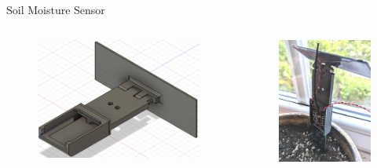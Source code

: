 \documentclass[hyphens]{beamer}
\begin{document}
\begin{frame}{Soil Moisture Sensor}
\begin{columns}[T]
\begin{column}{.5\textwidth}
    \begin{figure}
        \centering
        \includegraphics[width=\linewidth]{../thesis/img/sensor-case.png}
    \end{figure}
\end{column}
\hfil
\begin{column}{.5\textwidth}
    \begin{figure}
        \centering
        \includegraphics[width=\linewidth]{../thesis/img/sensor-deploy-close.jpg}

\end{figure}
\end{column}
\end{columns}
\end{frame}
\end{document}
